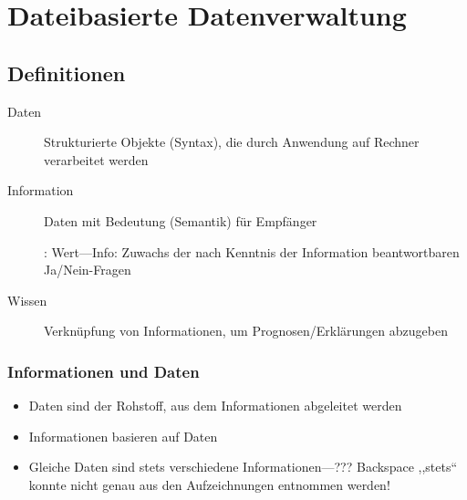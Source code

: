 


\chapter{Dateibasierte Datenverwaltung}


\section{Definitionen}
\begin{description}
  \item [{Daten}] 
	Strukturierte Objekte (Syntax), die durch Anwendung auf Rechner verarbeitet werden
  \item [{Information}] 
	Daten mit Bedeutung (Semantik) für Empfänger

	: Wert---Info: Zuwachs der nach Kenntnis der Information beantwortbaren Ja\slash{}Nein-Fragen

  \item [{Wissen}] 
	Verknüpfung von Informationen, um Prognosen/Erklärungen abzugeben
\end{description}

\subsection{Informationen und Daten}
\begin{itemize}
  \item Daten sind der Rohstoff, aus dem Informationen abgeleitet werden
  \item Informationen basieren auf Daten
  \item Gleiche Daten sind stets verschiedene Informationen---??? Backspace{} ,,stets`` konnte nicht genau aus den Aufzeichnungen entnommen werden!
\end{itemize}

